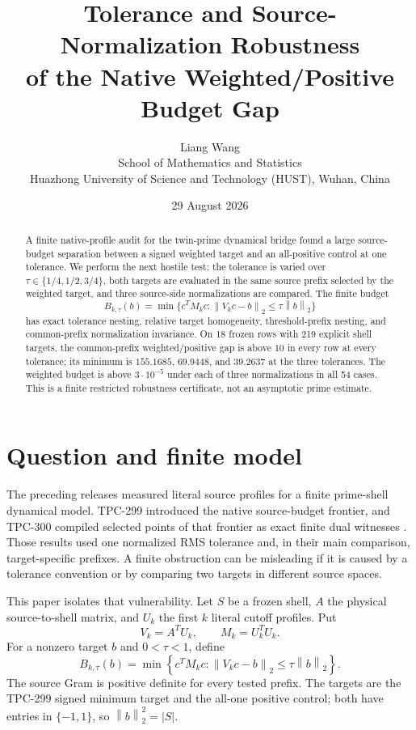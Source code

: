 \documentclass[11pt]{article}
\title{Tolerance and Source-Normalization Robustness\\
of the Native Weighted/Positive Budget Gap}
\author{Liang Wang\\
School of Mathematics and Statistics\\
Huazhong University of Science and Technology (HUST), Wuhan, China}
\date{29 August 2026}
\newcommand{\norm}[1]{\left\lVert #1\right\rVert}
\begin{document}
\maketitle

\begin{abstract}
A finite native-profile audit for the twin-prime dynamical bridge found a
large source-budget separation between a signed weighted target and an
all-positive control at one tolerance.  We perform the next hostile test:
the tolerance is varied over $\tau\in\{1/4,1/2,3/4\}$, both targets are
evaluated in the same source prefix selected by the weighted target, and
three source-side normalizations are compared.  The finite budget
\[
 B_{k,\tau}(b)=\min\{c^TM_kc:\norm{V_kc-b}_2\leq\tau\norm{b}_2\}
\]
has exact tolerance nesting, relative target homogeneity, threshold-prefix
nesting, and common-prefix normalization invariance.  On 18 frozen rows
with 219 explicit shell targets, the common-prefix weighted/positive gap is
above $10$ in every row at every tolerance; its minimum is $155.1685$,
$69.9448$, and $39.2637$ at the three tolerances.  The weighted budget is
above $3\cdot10^{-5}$ under each of three normalizations in all 54 cases.
This is a finite restricted robustness certificate, not an asymptotic
prime estimate.
\end{abstract}

\section{Question and finite model}

The preceding releases measured literal source profiles for a finite
prime-shell dynamical model.  TPC-299 introduced the native source-budget
frontier, and TPC-300 compiled selected points of that frontier as exact
finite dual witnesses \cite{tpc300}.  Those results used one normalized RMS
tolerance and, in their main comparison, target-specific prefixes.  A
finite obstruction can be misleading if it is caused by a tolerance
convention or by comparing two targets in different source spaces.

This paper isolates that vulnerability.  Let $S$ be a frozen shell, $A$ the
physical source-to-shell matrix, and $U_k$ the first $k$ literal cutoff
profiles.  Put
\[
        V_k=A^TU_k,\qquad M_k=U_k^TU_k.
\]
For a nonzero target $b$ and $0<\tau<1$, define
\[
 B_{k,\tau}(b)
 =\min\left\{c^TM_kc:
       \norm{V_kc-b}_2\leq\tau\norm{b}_2\right\}.       \tag{1}
\]
The source Gram is positive definite for every tested prefix.  The targets
are the TPC-299 signed minimum target and the all-one positive control; both
have entries in $\{-1,1\}$, so $\norm b_2^2=|S|$.
\end{document}
